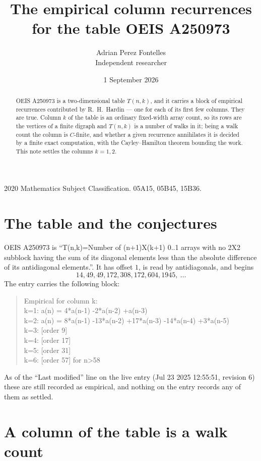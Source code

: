\documentclass[11pt,a4paper]{article}
\title{The empirical column recurrences for the table OEIS A250973}
\author{Adrian Perez Fontelles\\ \small Independent researcher}
\date{1 September 2026}
\theoremstyle{plain}
\theoremstyle{definition}
\begin{document}
\maketitle

\begin{abstract}
OEIS A250973 is a two-dimensional table $T(n,k)$, and it carries a block of empirical
recurrences contributed by R.~H.~Hardin --- one for each of its first few columns. They are
true. Column $k$ of the table is an ordinary fixed-width array count, so its rows are the
vertices of a finite digraph and $T(n,k)$ is a number of walks in it; being a walk count the
column is $C$-finite, and whether a given recurrence annihilates it is decided by a finite
exact computation, with the Cayley--Hamilton theorem bounding the work. This note settles the columns $k=1, 2$.
\end{abstract}

\noindent\small 2020 Mathematics Subject Classification. 05A15, 05B45, 15B36.\normalsize

\section{The table and the conjectures}

OEIS A250973 is ``T(n,k)=Number of (n+1)X(k+1) 0..1 arrays with no 2X2 subblock having the sum of its diagonal elements less than the absolute difference of its antidiagonal elements.''. It has offset $1$, is
read by antidiagonals, and begins
\[
14, 49, 49, 172, 308, 172, 604, 1945,\ \dots
\]
The entry carries the following block:
\begin{quote}\small
Empirical for column k:\\
k=1: a(n) = 4*a(n-1) -2*a(n-2) +a(n-3)\\
k=2: a(n) = 8*a(n-1) -13*a(n-2) +17*a(n-3) -14*a(n-4) +3*a(n-5)\\
k=3: [order 9]\\
k=4: [order 17]\\
k=5: [order 31]\\
k=6: [order 57] for n>58\\
\end{quote}
As of the ``Last modified'' line on the live entry (Jul 23 2025 12:55:51, revision 6) these are still
recorded as empirical, and nothing on the entry records any of them as settled.

\section{A column of the table is a walk count}
\end{document}
